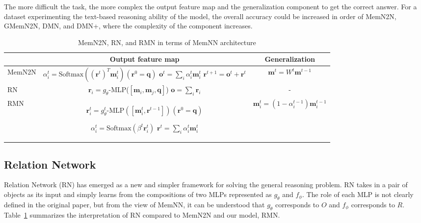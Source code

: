 \documentclass{article} \usepackage{iclr2018_conference,times}
\renewcommand{\vec}[1]{\mathbf{#1}}
\begin{document}
The more difficult the task, the more complex the output feature map and the generalization component to get the correct answer.
For a dataset experimenting the text-based reasoning ability of the model, the overall accuracy could be increased in order of MemN2N, GMemN2N, DMN, and DMN+, where the complexity of the component increases.


\begin{table}[t]
\centering
	\caption{MemN2N, RN, and RMN in terms of MemNN architecture}
	\label{table:comparisons}
\begin{tabular}{l|c|c}
\hline
        & Output feature map & Generalization \\ \hline
MemN2N  &   \makecell{\rule{0in}{2.7ex}$\alpha_i^t = \text{Softmax}(({\vec{r}^t})^T \vec{m}_i^{t}) \hspace{1pt} (\vec{r}^0 = \vec{q})$ \\ $\vec{o}^t = \sum_i \alpha_i^t \vec{m}_i^t$ \\ $\vec{r}^{t+1} = \vec{o}^{t} + \vec{r}^{t}$}    &         $\vec{m}^t = W^t \vec{m}^{t-1}$          \\ [3.3ex] \hline
RN    &         \makecell{\rule{0in}{2.5ex}$\vec{r}_i = g_\theta$-MLP($[\vec{m}_i, \vec{m}_j, \vec{q}]$) \\ $\vec{o} = \sum_i \vec{r}_i$}           &          -         \\  [2ex] \hline
RMN      &         \makecell{\rule{0in}{2.5ex}$\vec{r}_i^t = g_\theta^t\text{-MLP} ([\vec{m}_i^t, \vec{r}^{t-1}]) \hspace{1pt} (\vec{r}^0 = \vec{q})$ \\\rule{0in}{2.1ex} $\alpha_i^t = \text{Softmax}({\beta^t} \vec{r}_i^{t})$ \\ $\vec{r}^t = \sum_i \alpha_i^t \vec{m}_i^t$ }          &       $\vec{m}_i^t = (1-\alpha_i^{t-1})\vec{m}_i^{t-1}$        \\ [3.5ex] \hline
\end{tabular}
\end{table}


\subsection{Relation Network}

Relation Network (RN) has emerged as a new and simpler framework for solving the general reasoning problem.
RN takes in a pair of objects as its input and simply learns from the compositions of two MLPs represented as $g_\theta$ and $f_\phi$.
The role of each MLP is not clearly defined in the original paper, but from the view of MemNN, it can be understood that $g_\theta$ corresponds to $O$ and $f_\phi$ corresponds to $R$.
Table~\ref{table:comparisons} summarizes the interpretation of RN compared to MemN2N and our model, RMN.
\end{document}
